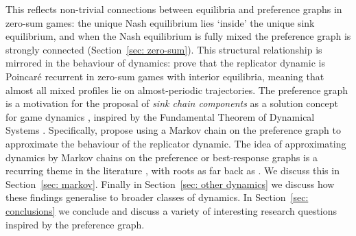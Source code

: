 \documentclass[preprint,authoryear]{elsarticle}
\begin{document}
This reflects non-trivial connections between equilibria and preference graphs in zero-sum games: the unique Nash equilibrium lies `inside' the unique sink equilibrium, and when the Nash equilibrium is fully mixed the preference graph is strongly connected \citep{biggar_attractor_2024} (Section~\ref{sec: zero-sum}). This structural relationship is mirrored in the behaviour of dynamics: \cite{papadimitriou2016nash} prove that the replicator dynamic is Poincar\'e recurrent in zero-sum games with interior equilibria, meaning that almost all mixed profiles lie on almost-periodic trajectories. The preference graph is a motivation for the proposal of \emph{sink chain components} as a solution concept for game dynamics \citep{papadimitriou_game_2019}, inspired by the Fundamental Theorem of Dynamical Systems \citep{conley_isolated_1978}. Specifically, \citeauthor{papadimitriou_game_2019} propose using a Markov chain on the preference graph to approximate the behaviour of the replicator dynamic. The idea of approximating dynamics by Markov chains on the preference or best-response graphs is a recurring theme in the literature \citep{young_evolution_1993,goemans_sink_2005,fabrikant2008complexity,omidshafiei_-rank_2019}, with roots as far back as \cite{cournot1838recherches}. We discuss this in Section~\ref{sec: markov}. Finally in Section~\ref{sec: other dynamics} we discuss how these findings generalise to broader classes of dynamics. In Section~\ref{sec: conclusions} we conclude and discuss a variety of interesting research questions inspired by the preference graph.

\end{document}
